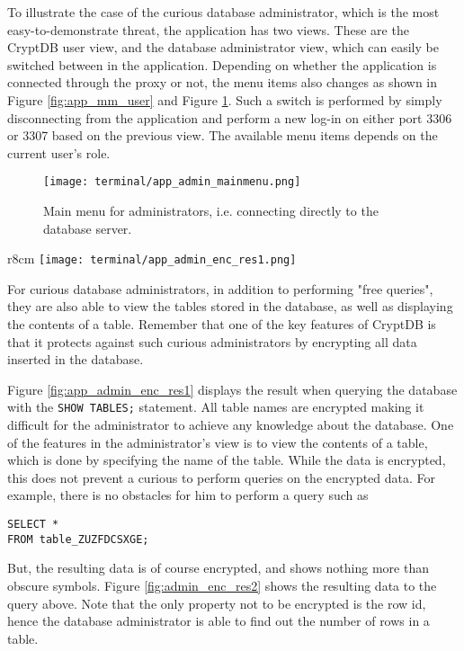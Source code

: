 To illustrate the case of the curious database administrator, which is the most easy-to-demonstrate threat, the application has two views. These are the CryptDB user view, and the database administrator view, which can easily be switched between in the application. Depending on whether the application is connected through the proxy or not, the menu items also changes as shown in Figure \ref{fig:app_mm_user} and Figure \ref{fig:app_mm_admin}. Such a switch is performed by simply disconnecting from the application and perform a new log-in on either port 3306 or 3307 based on the previous view. The available menu items depends on the current user's role.

\begin{figure}[h]
	\centering
	\texttt{[image: terminal/app\_admin\_mainmenu.png]}
	\caption{Main menu for administrators, i.e. connecting directly to the database server.}
	\label{fig:app_mm_admin}
\end{figure}

\begin{wrapfigure}[14]{r}{8cm}
	\centering
    \texttt{[image: terminal/app\_admin\_enc\_res1.png]}
    \caption{Encrypted tables in CryptDB from a database administrator's perspective}
    \label{fig:app_admin_enc_res1}
\end{wrapfigure}
For curious database administrators, in addition to performing "free queries", they are also able to view the tables stored in the database, as well as displaying the contents of a table. Remember that one of the key features of CryptDB is that it protects against such curious administrators by encrypting all data inserted in the database.

Figure \ref{fig:app_admin_enc_res1} displays the result when querying the database with the \verb!SHOW TABLES;! statement. All table names are encrypted making it difficult for the administrator to achieve any knowledge about the database. One of the features in the administrator's view is to view the contents of a table, which is done by specifying the name of the table. While the data is encrypted, this does not prevent a curious to perform queries on the encrypted data. For example, there is no obstacles for him to perform a query such as

\begin{verbatim}
SELECT *
FROM table_ZUZFDCSXGE;
\end{verbatim}

But, the resulting data is of course encrypted, and shows nothing more than obscure symbols. Figure \ref{fig:admin_enc_res2} shows the resulting data to the query above. Note that the only property not to be encrypted is the row id, hence the database administrator is able to find out the number of rows in a table.

